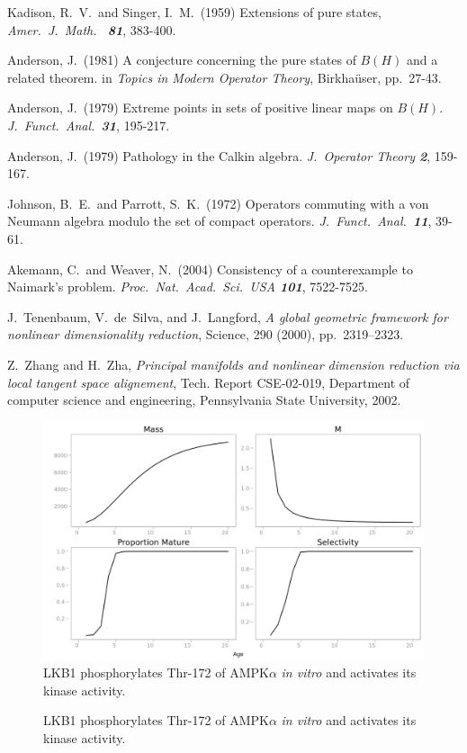 \documentclass{pnastwo}
\begin{document}
\begin{article}
\begin{thebibliography}{10}
Kadison, R.\ V.\ and Singer, I.\ M.\ (1959)
Extensions of pure states, {\it Amer.\ J.\ Math.\ \bf
81}, 383-400.

Anderson, J.\ (1981) A conjecture concerning the pure states of
$B(H)$ and a related theorem. in {\it Topics in Modern Operator
Theory}, Birkha\"user, pp.\ 27-43.

Anderson, J.\ (1979) Extreme points in sets of
positive linear maps on $B(H)$. {\it J.\ Funct.\
Anal.\
\bf 31}, 195-217.

Anderson, J.\ (1979) Pathology in the Calkin algebra. {\it J.\
Operator Theory \bf 2}, 159-167.

\bibitem{5}
Johnson, B.\ E.\ and Parrott, S.\ K.\ (1972) Operators commuting
with a von Neumann algebra modulo the set of compact operators.
{\it J.\ Funct.\ Anal.\ \bf 11}, 39-61.

\bibitem{6}
Akemann, C.\ and Weaver, N.\ (2004) Consistency of a
counterexample to Naimark's problem. {\it Proc.\ Nat.\ Acad.\
Sci.\ USA \bf 101}, 7522-7525.

\bibitem{TSL}
J.~Tenenbaum, V.~de~Silva, and J.~Langford, {\em A global geometric
  framework for nonlinear dimensionality reduction}, Science, 290 (2000),
  pp.~2319--2323.

\bibitem{ZhaZha}
Z.~Zhang and H.~Zha, {\em Principal manifolds and nonlinear dimension
  reduction via local tangent space alignement}, Tech. Report CSE-02-019,
  Department of computer science and engineering, Pennsylvania State
  University, 2002.
\end{thebibliography}
\end{article}

\begin{figure}
\centerline{\includegraphics[width=.4\textwidth]{fig1.png}}
\caption{LKB1 phosphorylates Thr-172 of AMPK$\alpha$ \textit{in vitro}
and activates its kinase activity.}\label{afoto}
\end{figure}

\begin{figure}[ht]
\begin{center}
\caption{LKB1 phosphorylates Thr-172 of AMPK$\alpha$ \textit{in vitro}
and activates its kinase activity.}\label{afoto2}
\end{center}
\end{figure}
\end{document}

